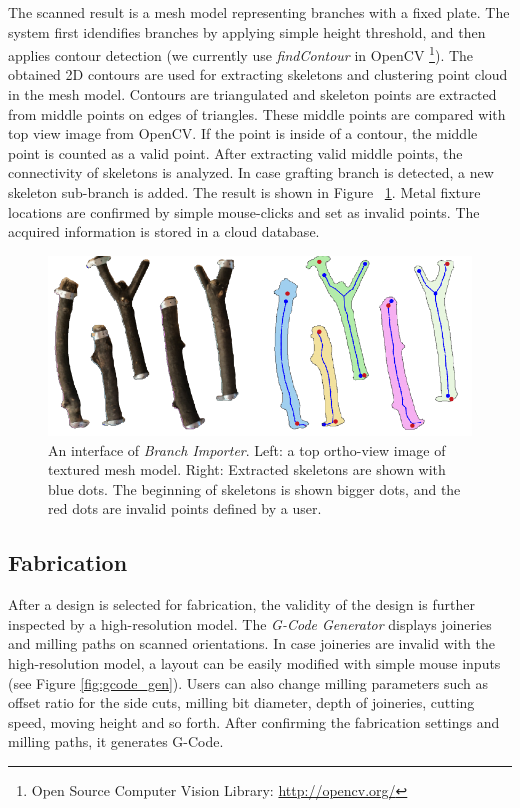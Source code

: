 The scanned result is a mesh model representing branches with a fixed plate.
The system first idendifies branches by applying simple height threshold, and then applies contour detection (we currently use \textit{findContour} in OpenCV \footnote{Open Source Computer Vision Library: \url{http://opencv.org/} }).
The obtained 2D contours are used for extracting skeletons and clustering point cloud in the mesh model.
Contours are triangulated and skeleton points are extracted from middle points on edges of triangles.
These middle points are compared with top view image from OpenCV.
If the point is inside of a contour, the middle point is counted as a valid point.
After extracting valid middle points, the connectivity of skeletons is analyzed.
In case grafting branch is detected, a new skeleton sub-branch is added.
The result is shown in Figure ~\ref{fig:skeleton}.
Metal fixture locations are confirmed by simple mouse-clicks and set as invalid points.
The acquired information is stored in a cloud database.

\begin{figure}[ht]
  \includegraphics[width = 0.4\paperwidth]{images/importer/importer.png}
  \caption{An interface of \textit{Branch Importer}. Left: a top ortho-view image of textured mesh model. Right: Extracted skeletons are shown with blue dots. The beginning of skeletons is shown bigger dots, and the red dots are invalid points defined by a user. }
  \label{fig:skeleton}
\end{figure}


\subsection{Fabrication}
\label{sec:fabrication}
After a design is selected for fabrication, the validity of the design is further inspected by a high-resolution model.
The \textit{G-Code Generator} displays joineries and milling paths on scanned orientations.
In case joineries are invalid with the high-resolution model, a layout can be easily modified with simple mouse inputs (see Figure \ref{fig:gcode_gen}).
Users can also change milling parameters such as offset ratio for the side cuts, milling bit diameter, depth of joineries, cutting speed, moving height and so forth.
After confirming the fabrication settings and milling paths, it generates G-Code.\\

